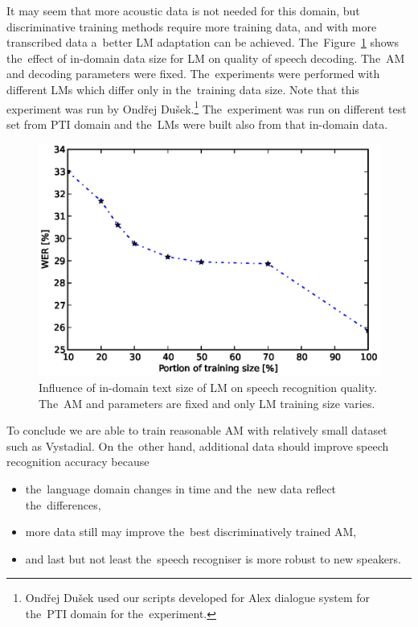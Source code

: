 It may seem that more acoustic data is not needed for this domain, but discriminative training methods require more training data, and with more transcribed data a~better \ac{LM} adaptation can be achieved.
The~Figure~\ref{fig:partials_lm} shows the~effect of in-domain data size for \ac{LM} on quality of speech decoding.
The~\ac{AM}  and decoding parameters were fixed.
The~experiments were performed with different \acp{LM} which differ only in the~training data size. 
Note that this experiment was run by Ondřej Dušek.\footnote{Ondřej Dušek used our scripts developed for Alex dialogue system for the~\ac{PTI} domain for the~experiment.}
The~experiment was run on different test set from \acf{PTI} domain and the~\acp{LM} were built also from that in-domain data.
\begin{figure}[!htp]
    \begin{center}
    \includegraphics[scale=0.7]{images/partial-lm-tri2b-bmmi.ps}
    \caption{Influence of in-domain text size of \ac{LM} on speech recognition quality. The~\ac{AM}  and parameters are fixed and only \ac{LM} training size varies.}
    \label{fig:partials_lm} 
    \end{center}
\end{figure}

To conclude we are able to train reasonable \ac{AM} with relatively small dataset such as Vystadial.
On the~other hand, additional data should improve speech recognition accuracy because
\begin{itemize}
    \item the~language domain changes in time and the~new data reflect the~differences,
    \item more data still may improve the~best discriminatively trained \ac{AM},
    \item and last but not least the~speech recogniser is more robust to new speakers.
\end{itemize}

